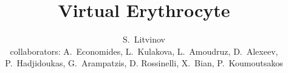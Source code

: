 \author[Litvinov]
{S.~Litvinov \\ collaborators: A.~Economides, L.~Kulakova,
L.~Amoudruz, D.~Alexeev, P.~Hadjidoukas, G.~Arampatzis, D. Rossinelli,
X.~Bian, P.~Koumoutsakos}
\title{Virtual Erythrocyte}
\date{}
